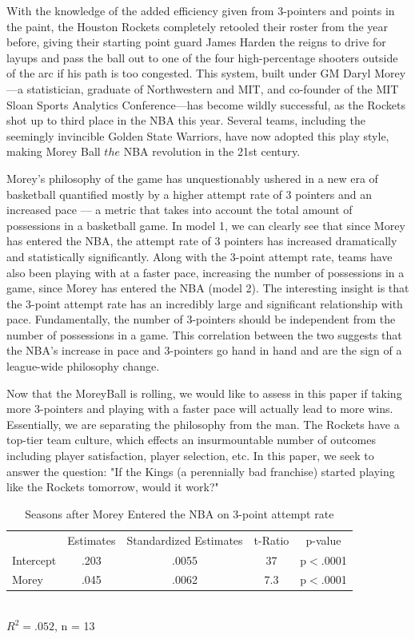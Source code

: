 \documentclass[12pt]{article}
\begin{document}
        	With the knowledge of the added efficiency given from 3-pointers and points in the paint, the Houston Rockets completely retooled their roster from the year before, giving their starting point guard James Harden the reigns to drive for layups and pass the ball out to one of the four high-percentage shooters outside of the arc if his path is too congested. This system, built under GM Daryl Morey---a statistician, graduate of Northwestern and MIT, and co-founder of the MIT Sloan Sports Analytics Conference---has become wildly successful, as the Rockets shot up to third place in the NBA this year. Several teams, including the seemingly invincible Golden State Warriors, have now adopted this play style, making Morey Ball $the$ NBA revolution in the 21st century. \par
Morey's philosophy of the game has unquestionably ushered in a new era of basketball quantified mostly by a higher attempt rate of 3 pointers and an increased pace --- a metric that takes into account the total amount of possessions in a basketball game. In model 1, we can clearly see that since Morey has entered the NBA, the attempt rate of 3 pointers has increased dramatically and statistically significantly. Along with the 3-point attempt rate, teams have also been playing with at a faster  pace, increasing the number of possessions in a game, since Morey has entered the NBA (model 2). The interesting insight is that the 3-point attempt rate has an incredibly large and significant relationship with pace. Fundamentally, the number of 3-pointers should be independent from the number of possessions in a game. This correlation between the two suggests that the NBA's increase in pace and 3-pointers go hand in hand and are the sign of a league-wide philosophy change. \par
Now that the MoreyBall is rolling, we would like to assess in this paper if taking more 3-pointers and playing with a faster pace will actually lead to more wins. Essentially, we are separating the philosophy from the man. The Rockets have a top-tier team culture, which effects an insurmountable number of outcomes including player satisfaction, player selection, etc. In this paper, we seek to answer the question: "If the Kings (a perennially bad franchise) started playing like the Rockets tomorrow, would it work?"\par
 \begin{table}[ht]
\def\tablename{Model}
\caption{Seasons after Morey Entered the NBA on 3-point attempt rate}
\centering
\begin{tabular}{lcccc}
\hline \hline
& Estimates  &  Standardized Estimates  &  t-Ratio  &  p-value  \\
Intercept & .203 & .0055 & 37 & p$<$.0001\\
Morey & .045 & .0062 & 7.3 & p$<$.0001\\

\end{tabular}
\\ 
\scriptsize{$R^2 = .052$,  n = 13}\\

\end{table}
\end{document}
